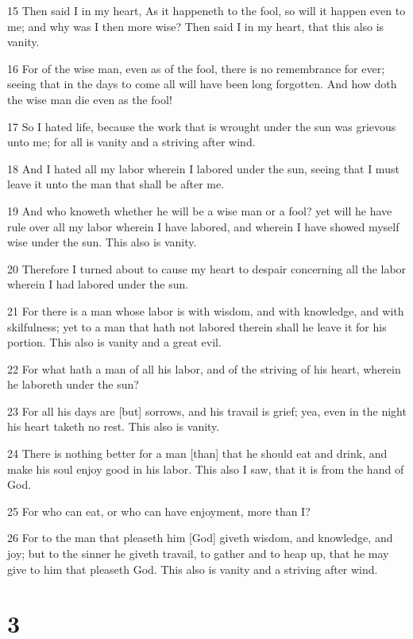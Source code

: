 \par 15 Then said I in my heart, As it happeneth to the fool, so will it happen even to me; and why was I then more wise? Then said I in my heart, that this also is vanity.
\par 16 For of the wise man, even as of the fool, there is no remembrance for ever; seeing that in the days to come all will have been long forgotten. And how doth the wise man die even as the fool!
\par 17 So I hated life, because the work that is wrought under the sun was grievous unto me; for all is vanity and a striving after wind.
\par 18 And I hated all my labor wherein I labored under the sun, seeing that I must leave it unto the man that shall be after me.
\par 19 And who knoweth whether he will be a wise man or a fool? yet will he have rule over all my labor wherein I have labored, and wherein I have showed myself wise under the sun. This also is vanity.
\par 20 Therefore I turned about to cause my heart to despair concerning all the labor wherein I had labored under the sun.
\par 21 For there is a man whose labor is with wisdom, and with knowledge, and with skilfulness; yet to a man that hath not labored therein shall he leave it for his portion. This also is vanity and a great evil.
\par 22 For what hath a man of all his labor, and of the striving of his heart, wherein he laboreth under the sun?
\par 23 For all his days are [but] sorrows, and his travail is grief; yea, even in the night his heart taketh no rest. This also is vanity.
\par 24 There is nothing better for a man [than] that he should eat and drink, and make his soul enjoy good in his labor. This also I saw, that it is from the hand of God.
\par 25 For who can eat, or who can have enjoyment, more than I?
\par 26 For to the man that pleaseth him [God] giveth wisdom, and knowledge, and joy; but to the sinner he giveth travail, to gather and to heap up, that he may give to him that pleaseth God. This also is vanity and a striving after wind.

\chapter{3}

